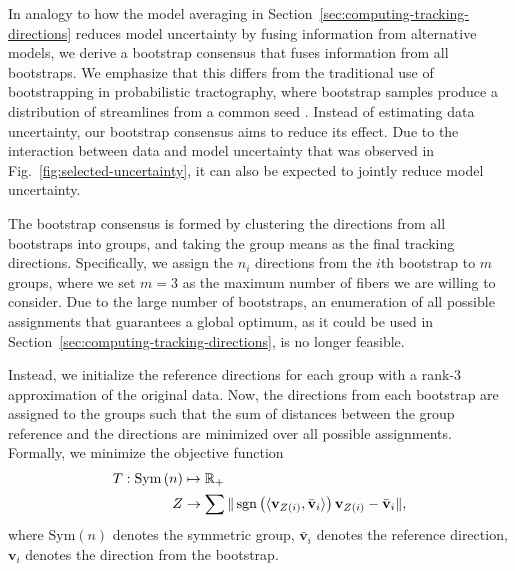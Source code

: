 In analogy to how the model averaging in Section~\ref{sec:computing-tracking-directions} reduces model uncertainty by fusing information from alternative models, we derive a bootstrap consensus that fuses information from all bootstraps. We emphasize that this differs from the traditional use of bootstrapping in probabilistic tractography, where bootstrap samples produce a distribution of streamlines from a common seed \cite{Jones:2008,Jeurissen:2011}. Instead of estimating data uncertainty, our bootstrap consensus aims to reduce its effect. Due to the interaction between data and model uncertainty that was observed in Fig.~\ref{fig:selected-uncertainty}, it can also be expected to jointly reduce model uncertainty.

The bootstrap consensus is formed by clustering the directions from all bootstraps into groups, and taking the group means as the final tracking directions. Specifically, we assign the $n_i$ directions from the $i$th bootstrap to $m$ groups, where we set $m=3$ as the maximum number of fibers we are willing to consider. Due to the large number of bootstraps, an enumeration of all possible assignments that guarantees a global optimum, as it could be used in Section~\ref{sec:computing-tracking-directions}, is no longer feasible.

Instead, we initialize the reference
directions for each group with a rank-$3$ approximation of the original data. Now, the
directions from each bootstrap are assigned to the groups such that the sum of
distances between the group
reference and the directions are minimized over all possible assignments. Formally, we minimize the objective function 
\begin{align}
  \label{eq:matching-cost}
	T : \text{Sym} \left( n \right) & \mapsto \mathbb{R}_+ \nonumber \\
	Z & \rightarrow \sum \| \operatorname*{sgn} \left( \langle \mathbf{v}_{Z\left( i
	\right)}, \bar{\mathbf{v}}_i \rangle \right) \mathbf{v}_{Z\left( i
	\right)} - \bar{\mathbf{v}}_i\| ,  
\end{align} 
where $\text{Sym}\left( n \right)$ denotes the symmetric group, 
$\bar{\mathbf{v}}_i$ denotes
the reference direction, $\mathbf{v}_i$ denotes the direction from the
bootstrap.

